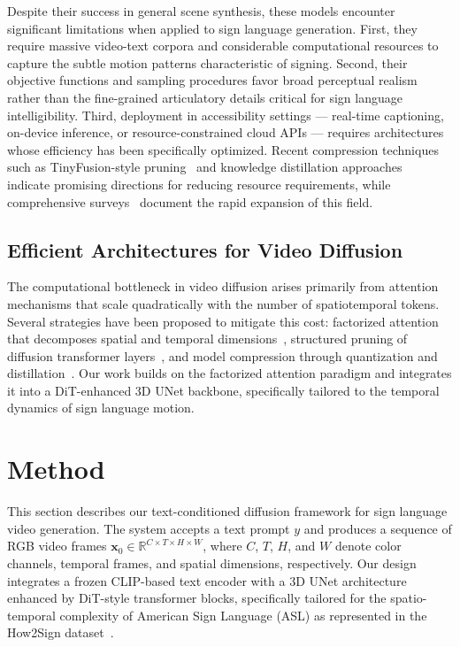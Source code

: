 \documentclass{ieeeaccess}
\begin{document}
Despite their success in general scene synthesis, these models encounter significant limitations when applied to sign language generation. First, they require massive video-text corpora and considerable computational resources to capture the subtle motion patterns characteristic of signing. Second, their objective functions and sampling procedures favor broad perceptual realism rather than the fine-grained articulatory details critical for sign language intelligibility. Third, deployment in accessibility settings — real-time captioning, on-device inference, or resource-constrained cloud APIs — requires architectures whose efficiency has been specifically optimized. Recent compression techniques such as TinyFusion-style pruning~\cite{fang2025tinyfusion} and knowledge distillation approaches~\cite{hinton2015distillation, sanh2020distilbert} indicate promising directions for reducing resource requirements, while comprehensive surveys~\cite{zhang2025videodiffusionsurvey, arxiv2025videosurvey} document the rapid expansion of this field.

\subsection{Efficient Architectures for Video Diffusion}

The computational bottleneck in video diffusion arises primarily from attention mechanisms that scale quadratically with the number of spatiotemporal tokens. Several strategies have been proposed to mitigate this cost: factorized attention that decomposes spatial and temporal dimensions~\cite{ho2022videodiffusion}, structured pruning of diffusion transformer layers~\cite{fang2025tinyfusion}, and model compression through quantization and distillation~\cite{han2016deepcompression}. Our work builds on the factorized attention paradigm and integrates it into a DiT-enhanced 3D UNet backbone, specifically tailored to the temporal dynamics of sign language motion.

\section{Method}
\label{sec:method}

This section describes our text-conditioned diffusion framework for sign language video generation. The system accepts a text prompt $y$ and produces a sequence of RGB video frames $\mathbf{x}_0 \in \mathbb{R}^{C \times T \times H \times W}$, where $C$, $T$, $H$, and $W$ denote color channels, temporal frames, and spatial dimensions, respectively. Our design integrates a frozen CLIP-based text encoder with a 3D UNet architecture enhanced by DiT-style transformer blocks, specifically tailored for the spatio-temporal complexity of American Sign Language (ASL) as represented in the How2Sign dataset~\cite{duarte2021how2sign}.
\end{document}
